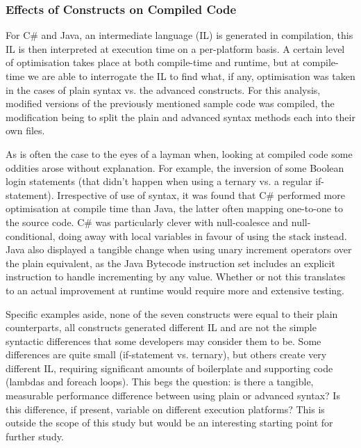 \documentclass{article}
\begin{document}
        \subsubsection{Effects of Constructs on Compiled Code}
            For C\# and Java, an intermediate language (IL) is generated in compilation, this IL is then interpreted at execution time on a per-platform basis. A certain level of optimisation takes place at both compile-time and runtime, but at compile-time we are able to interrogate the IL to find what, if any, optimisation was taken in the cases of plain syntax vs. the advanced constructs. For this analysis, modified versions of the previously mentioned sample code was compiled, the modification being to split the plain and advanced syntax methods each into their own files.

            As is often the case to the eyes of a layman when, looking at compiled code some oddities arose without explanation. For example, the inversion of some Boolean login statements (that didn't happen when using a ternary vs. a regular if-statement). Irrespective of use of syntax, it was found that C\# performed more optimisation at compile time than Java, the latter often mapping one-to-one to the source code. C\# was particularly clever with null-coalesce and null-conditional, doing away with local variables in favour of using the stack instead. Java also displayed a tangible change when using unary increment operators over the plain equivalent, as the Java Bytecode instruction set includes an explicit instruction to handle incrementing by any value. Whether or not this translates to an actual improvement at runtime would require more and extensive testing.

            Specific examples aside, none of the seven constructs were equal to their plain counterparts, all constructs generated different IL and are not the simple syntactic differences that some developers may consider them to be. Some differences are quite small (if-statement vs. ternary), but others create very different IL, requiring significant amounts of boilerplate and supporting code (lambdas and foreach loops). This begs the question: is there a tangible, measurable performance difference between using plain or advanced syntax? Is this difference, if present, variable on different execution platforms? This is outside the scope of this study but would be an interesting starting point for further study.

    \newpage
\end{document}
